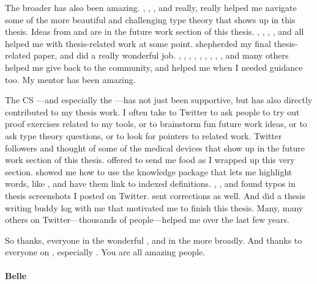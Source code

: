 The broader  has also been amazing.
, , , and  really, really helped me navigate
some of the more beautiful and challenging type theory that shows up in this thesis.
Ideas from  and  are in the future work section of this thesis.
, , , , and  all helped me with
thesis-related work at some point.
 shepherded my final thesis-related paper, and did a really wonderful job.
, , , ,
, , , , , and many others helped me give back to the community,
and helped me when I needed guidance too.
My mentor  has been amazing.

The CS ---and especially the ---has not just been supportive,
but has also directly contributed to my thesis work.
I often take to Twitter to ask people to try out proof exercises related to my tools,
or to brainstorm fun future work ideas,
or to ask type theory questions,
or to look for pointers to related work.
Twitter followers  and  thought of some of the medical devices
that show up in the future work section of this thesis.
 offered to send me food as I wrapped up this very section.
 showed me how to use the knowledge package that lets
me highlight words, like , and have them link to indexed definitions.
, , and  found typos in thesis screenshots I posted on Twitter.
 sent corrections as well.
And  did a thesis writing buddy log with me that motivated me to finish this thesis.
Many, many others on Twitter---thousands of people---helped me over the last few years.

So thanks, everyone in the wonderful , and in the  more broadly.
And thanks to everyone on , especially .
You are all amazing people.

\paragraph{Belle}


